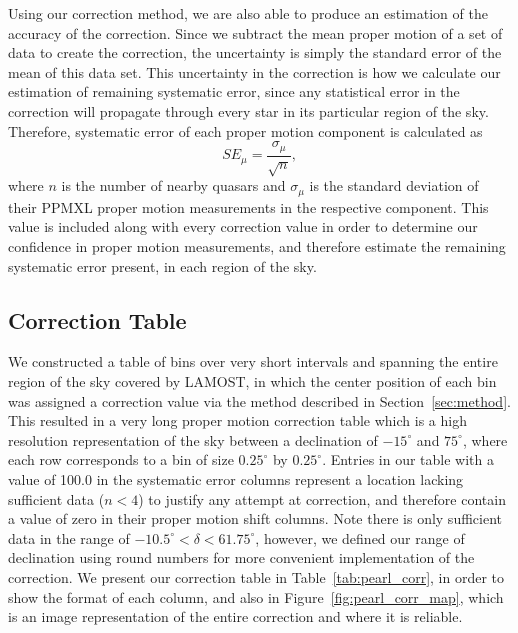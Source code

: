 \documentclass[11pt,preprint]{aastex6}
\begin{document}
Using our correction method, we are also able to produce an estimation of the accuracy of the correction.
Since we subtract the mean proper motion of a set of data to create the correction, the uncertainty is simply the standard error of the mean of this data set.
This uncertainty in the correction is how we calculate our estimation of remaining systematic error, since any statistical error in the correction will propagate through every star in its particular region of the sky.
Therefore, systematic error of each proper motion component is calculated as
\begin{equation}
SE_{\mu} = \frac{\sigma_{\mu}}{\sqrt{n}},
\end{equation}
where $n$ is the number of nearby quasars and $\sigma_{\mu}$ is the standard deviation of their PPMXL proper motion measurements in the respective component.
This value is included along with every correction value in order to determine our confidence in proper motion measurements, and therefore estimate the remaining systematic error present, in each region of the sky.

\subsection{Correction Table}

We constructed a table of bins over very short intervals and spanning the entire region of the sky covered by LAMOST, in which the center position of each bin was assigned a correction value via the method described in Section~\ref{sec:method}.
This resulted in a very long proper motion correction table which is a high resolution representation of the sky between a declination of $-15^{\circ}$ and $75^{\circ}$, where each row corresponds to a bin of size $0.25^{\circ}$ by $0.25^{\circ}$.
Entries in our table with a value of 100.0 in the systematic error columns represent a location lacking sufficient data ($n < 4$) to justify any attempt at correction, and therefore contain a value of zero in their proper motion shift columns.
Note there is only sufficient data in the range of $-10.5^{\circ} < \delta < 61.75^{\circ}$, however, we defined our range of declination using round numbers for more convenient implementation of the correction.
We present our correction table in Table~\ref{tab:pearl_corr}, in order to show the format of each column, and also in Figure~\ref{fig:pearl_corr_map}, which is an image representation of the entire correction and where it is reliable.
\end{document}
